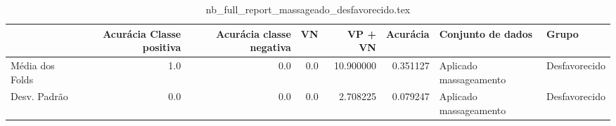 \begin{table}
\centering
\caption{nb_full_report_massageado_desfavorecido.tex}
\label{nb_full_report_massageado_desfavorecido.tex}
\begin{tabular}{lrrrrrll}
\toprule
{} &  Acurácia Classe positiva &  Acurácia classe negativa &  VN  &   VP + VN  &  Acurácia &       Conjunto de dados &          Grupo \\
\midrule
Média dos Folds &                       1.0 &                       0.0 &  0.0 &  10.900000 &  0.351127 &  Aplicado massageamento &  Desfavorecido \\
Desv. Padrão    &                       0.0 &                       0.0 &  0.0 &   2.708225 &  0.079247 &  Aplicado massageamento &  Desfavorecido \\
\bottomrule
\end{tabular}
\end{table}
